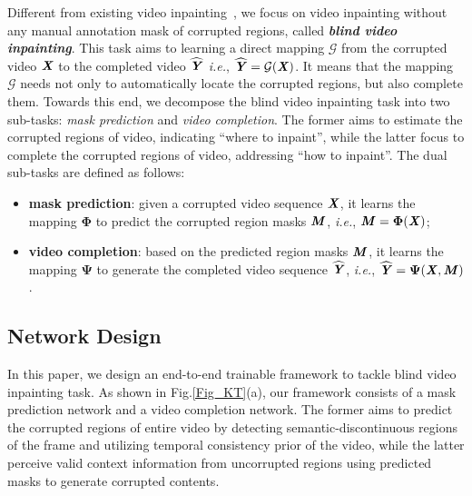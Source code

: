 Different from existing video inpainting~\cite{cai2022devit,liu2021fuseformer,Ren_2022_CVPR,yan2020sttn,zhang2022flow}, 
we focus on video inpainting without any manual annotation mask of corrupted regions,
called \emph{\textbf{blind video inpainting}}.
This task aims to learning a direct mapping {$\mathcal{G}$} from the corrupted video $\textbf{\emph{X}}$ to the completed video $\widehat{\textbf{\emph{Y}}}$ 
\emph{i.e.}, $\widehat{\textbf{\emph{Y}}}=\mathcal{G}(\textbf{\emph{X}})$.
It means that the mapping $\mathcal{G}$ needs not only to automatically locate the corrupted regions, but also complete them.
Towards this end,
we decompose the blind video inpainting task into two sub-tasks: \emph{mask prediction} and \emph{video completion}.
The former aims to estimate the corrupted regions of video, indicating “where to inpaint”, while the latter focus to complete the corrupted regions of video, addressing “how to inpaint”.
The dual sub-tasks are defined as follows:
\begin{itemize}
    \item \textbf{mask prediction}: 
    given a corrupted video sequence $\textbf{\emph{X}}$, it learns the mapping $\bm\Phi$ to predict the corrupted region masks $\textbf{\emph{M}}$, \emph{i.e.}, $\textbf{\emph{M}} = \bm \Phi(\textbf{\emph{X}})$;
    
    \item \textbf{video completion}:
    based on the predicted region masks $\textbf{\emph{M}}$,
    it learns the mapping $\bm\Psi$ to generate the completed video sequence $\widehat{\textbf{\emph{Y}}}$, \emph{i.e.}, 
    $\widehat{\textbf{\emph{Y}}} = \bm \Psi(\textbf{\emph{X}},\textbf{\emph{M}})$.
\end{itemize}

\subsection{Network Design}
\label{Network Design}

In this paper, we design an end-to-end trainable framework to tackle blind video inpainting task. 
As shown in Fig.\ref{Fig_KT}(a), our framework consists of a mask prediction network and a video completion network.
The former aims to predict the corrupted regions of entire video by detecting semantic-discontinuous regions of the frame and utilizing temporal consistency prior of the video, while the latter perceive valid context information from uncorrupted regions using predicted masks to generate corrupted contents.

